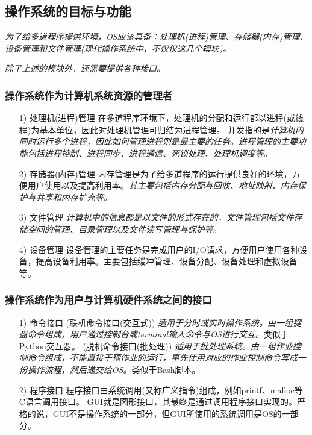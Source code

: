 \subsection{操作系统的目标与功能}

    \emph{为了给多道程序提供环境，OS应该具备：处理机(进程)管理、存储器(内存)管理、设备管理和文件管理(现代操作系统中，不仅仅这几个模块)。}

    \emph{除了上述的模块外，还需要提供各种接口。}

\subsubsection{操作系统作为计算机系统资源的管理者}

\begin{itemize}
    \item [1)] 处理机(进程)管理
    \subitem 在多道程序环境下，处理机的分配和运行都以进程(或线程)为基本单位，因此对处理机管理可归结为进程管理。
    \subitem 并发指的是\emph{计算机内同时运行多个进程，因此如何管理进程则是最主要的任务。进程管理的主要功能包括进程控制、进程同步、进程通信、死锁处理、处理机调度等。}
    \item [2)] 存储器(内存)管理
    \subitem 内存管理是为了给多道程序的运行提供良好的环境，方便用户使用以及提高利用率。\emph{其主要包括内存分配与回收、地址映射、内存保护与共享和内存扩充等。}
    \item [3)] 文件管理
    \subitem \emph{{\color{red}计算机中的信息都是以文件的形式存在的}，文件管理包括文件存储空间的管理、目录管理以及文件读写管理与保护等。}
    \item [4)] 设备管理
    \subitem 设备管理的主要任务是完成用户的I/O请求，方便用户使用各种设备，提高设备利用率。主要包括缓冲管理、设备分配、设备处理和虚拟设备等。
\end{itemize}

\subsubsection{操作系统作为用户与计算机硬件系统之间的接口}

\begin{itemize}
    \item [1)] 命令接口
    \subitem (联机命令接口(交互式)) \emph{{\color{red}适用于分时或实时操作系统。}由一组键盘命令组成，用户通过控制台或terminal输入命令与OS进行交互。}类似于Python交互器。
    \subitem (脱机命令接口(批处理)) \emph{{\color{red}适用于批处理系统。}由一组作业控制命令组成，不能直接干预作业的运行，事先使用对应的作业控制命令写成一份操作流程，然后递交给OS。}类似于Bash脚本。
    \item [2)] 程序接口
    \subitem 程序接口由系统调用(又称广义指令)组成，例如printf、malloc等C语言调用接口。
    \subitem GUI就是图形接口，其最终是通过调用程序接口实现的。{\color{red}严格的说，GUI不是操作系统的一部分，但GUI所使用的系统调用是OS的一部分。}
\end{itemize}

